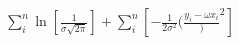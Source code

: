 \documentclass[preview]{standalone}
\begin{document}
\begin{align*}
\sum_i^n \ln [ \frac{1}{\sigma \sqrt{2 \pi}} ] + \sum_i^n [ -\frac{1}{2{\sigma}^2}(\frac{y_i -\omega x_i})^2 ]
\end{align*}
\end{document}
